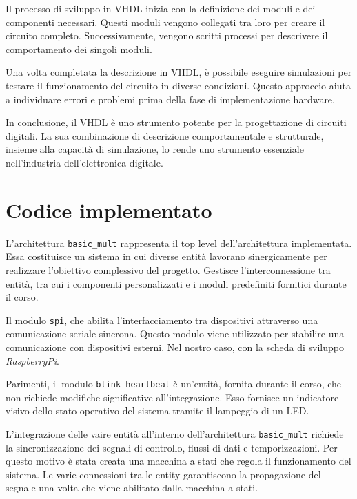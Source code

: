 \documentclass[titlepage]{report}
\begin{document}
		Il processo di sviluppo in VHDL inizia con la definizione dei moduli e dei componenti necessari. Questi moduli vengono collegati tra loro per creare il circuito completo. Successivamente, vengono scritti processi per descrivere il comportamento dei singoli moduli.

		Una volta completata la descrizione in VHDL, è possibile eseguire simulazioni per testare il funzionamento del circuito in diverse condizioni. Questo approccio aiuta a individuare errori e problemi prima della fase di implementazione hardware.

		In conclusione, il VHDL è uno strumento potente per la progettazione di circuiti digitali. La sua combinazione di descrizione comportamentale e strutturale, insieme alla capacità di simulazione, lo rende uno strumento essenziale nell'industria dell'elettronica digitale.
	\section*{Codice implementato}
	\label{sec:vhdl_code}
		
		L'architettura \texttt{basic\_mult} rappresenta il top level dell'architettura implementata. Essa costituisce un sistema in cui diverse entità lavorano sinergicamente per realizzare l'obiettivo complessivo del progetto.
		Gestisce l'interconnessione tra entità, tra cui i componenti personalizzati e i moduli predefiniti fornitici durante il corso.
		
		Il modulo \texttt{spi}, che abilita l'interfacciamento tra dispositivi attraverso una comunicazione seriale sincrona. Questo modulo viene utilizzato per stabilire una comunicazione con dispositivi esterni. Nel nostro caso, con la scheda di sviluppo \textit{RaspberryPi}.

		Parimenti, il modulo \texttt{blink heartbeat} è un'entità, fornita durante il corso, che non richiede modifiche significative all'integrazione. Esso fornisce un indicatore visivo dello stato operativo del sistema tramite il lampeggio di un LED.

		L'integrazione delle vaire entità all'interno dell'architettura \texttt{basic\_mult} richiede la sincronizzazione dei segnali di controllo, flussi di dati e temporizzazioni.
		Per questo motivo è stata creata una macchina a stati che regola il funzionamento del sistema. Le varie connessioni tra le entity garantiscono la propagazione del segnale una volta che viene abilitato dalla macchina a stati.
\end{document}
